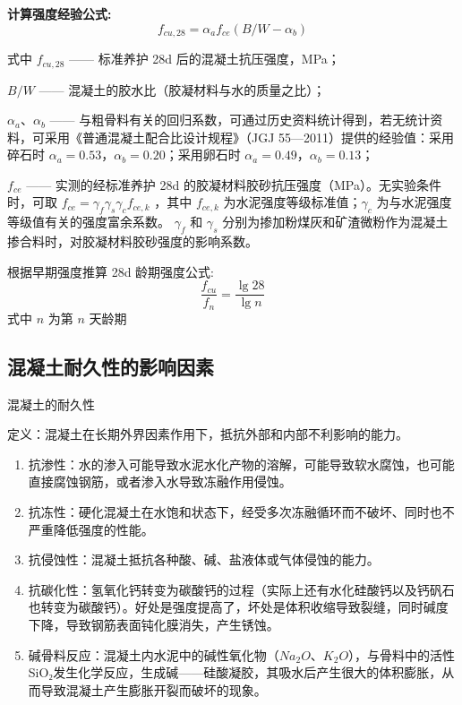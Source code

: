 \documentclass[12pt, a4paper, oneside, UTF8]{ctexbook}
\begin{document}
\textbf{计算强度经验公式:}
$$ f_{cu,28} = \alpha_{a} f_{ce} (B/W - \alpha_{b}) $$

式中 $f_{cu,28}$ —— 标准养护 28d 后的混凝土抗压强度，MPa；

$B/W$ —— 混凝土的胶水比（胶凝材料与水的质量之比）；

$\alpha_{a}$、$\alpha_{b}$ —— 与粗骨料有关的回归系数，可通过历史资料统计得到，若无统计资料，可采用《普通混凝土配合比设计规程》（JGJ 55—2011）提供的经验值：采用碎石时 $\alpha_{a} = 0.53$，$\alpha_{b} = 0.20$；采用卵石时 $\alpha_{a} = 0.49$，$\alpha_{b} = 0.13$；

$f_{ce}$ —— 实测的经标准养护 28d 的胶凝材料胶砂抗压强度（MPa）。无实验条件时，可取 $f_{ce}= \gamma_{f} \gamma_{s} \gamma_{c} f_{ce,k}$
，其中 $f_{ce,k}$ 为水泥强度等级标准值；$\gamma_{c}$ 为与水泥强度等级值有关的强度富余系数。
$\gamma_{f}$ 和 $\gamma_{s}$ 分别为掺加粉煤灰和矿渣微粉作为混凝土掺合料时，对胶凝材料胶砂强度的影响系数。

\begin{remark}
    根据早期强度推算 28d 龄期强度公式:
$$
\frac{f_{cu}}{f_n} = \frac{\lg 28}{\lg n}
$$
式中 $n$ 为第 $n$ 天龄期
\end{remark}

\newpage

\subsection{混凝土耐久性的影响因素}

\begin{definition}
混凝土的耐久性

定义：混凝土在长期外界因素作用下，抵抗外部和内部不利影响的能力。

\begin{enumerate}
    \item 抗渗性：水的渗入可能导致水泥水化产物的溶解，可能导致软水腐蚀，也可能直接腐蚀钢筋，或者渗入水导致冻融作用侵蚀。
    \item 抗冻性：硬化混凝土在水饱和状态下，经受多次冻融循环而不破坏、同时也不严重降低强度的性能。
    \item 抗侵蚀性：混凝土抵抗各种酸、碱、盐液体或气体侵蚀的能力。
    \item 抗碳化性：氢氧化钙转变为碳酸钙的过程（实际上还有水化硅酸钙以及钙矾石也转变为碳酸钙）。好处是强度提高了，坏处是体积收缩导致裂缝，同时碱度下降，导致钢筋表面钝化膜消失，产生锈蚀。
    \item 碱骨料反应：混凝土内水泥中的碱性氧化物（$Na_2O$、$K_2O$），与骨料中的活性SiO₂发生化学反应，生成碱——硅酸凝胶，其吸水后产生很大的体积膨胀，从而导致混凝土产生膨胀开裂而破坏的现象。
\end{enumerate}
\end{definition}
\end{document}
